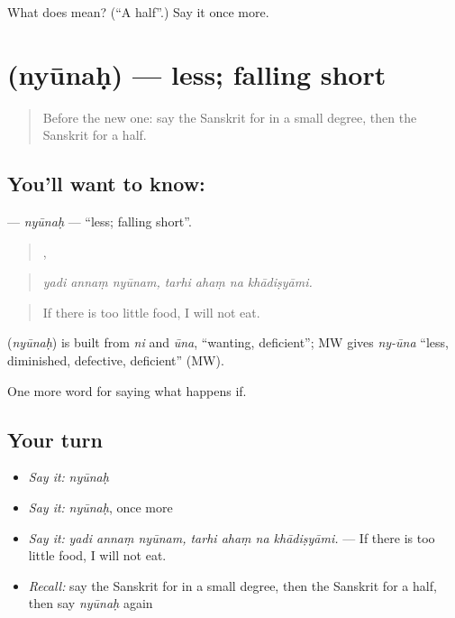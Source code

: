 \begin{tcolorbox}[breakable,colback=teal!4,colframe=teal!35!black,title={Before you move on}]
What does  mean? (\textquotedblleft{}A half\textquotedblright{}.) Say it once more.
\end{tcolorbox}
\section[\texorpdfstring{\sk{न्यूनः} (nyūnaḥ)}{न्यूनः (nyūnaḥ)}]{ (nyūnaḥ) — less; falling short}

\label{lesson:SA-C378-nyunah}



\begin{quote}
Before the new one: say the Sanskrit for in a small degree, then the Sanskrit for a half.
\end{quote}

\subsection*{You'll want to know: }
\textbf{} — \emph{nyūnaḥ} — \textquotedblleft{}less; falling short\textquotedblright{}.

\begin{quote}
  ,    
\end{quote}

\begin{quote}
\emph{yadi annaṃ nyūnam, tarhi ahaṃ na khādiṣyāmi.}
\end{quote}

\begin{quote}
If there is too little food, I will not eat.
\end{quote}

\begin{cousinweb}
\textbf{} (\emph{nyūnaḥ}) is built from \emph{ni} and \emph{ūna}, \textquotedblleft{}wanting, deficient\textquotedblright{}; MW gives \emph{ny-ūna} \textquotedblleft{}less, diminished, defective, deficient\textquotedblright{} (MW).
\end{cousinweb}

\begin{grammarlens}[title={What you've built}]
One more word for saying what happens if.
\end{grammarlens}

\subsection*{Your turn}
\begin{itemize}
\raggedright
  \item \emph{Say it:} \emph{nyūnaḥ}
  \item \emph{Say it:} \emph{nyūnaḥ}, once more
  \item \emph{Say it:} \emph{yadi annaṃ nyūnam, tarhi ahaṃ na khādiṣyāmi.} — If there is too little food, I will not eat.
  \item \emph{Recall:} say the Sanskrit for in a small degree, then the Sanskrit for a half, then say \emph{nyūnaḥ} again
\end{itemize}

